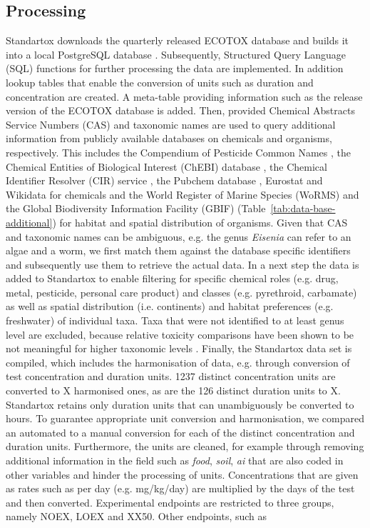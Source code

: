 \documentclass[journal,datadescriptor,accept,moreauthors,pdftex]{Definitions/mdpi}
\begin{document}
\subsection{Processing}
Standartox downloads the quarterly released ECOTOX database and builds it into a local PostgreSQL database \citep{szocs_build_2019}. Subsequently, Structured Query Language (SQL) functions for further processing the data are implemented. In addition lookup tables that enable the conversion of units such as duration and concentration are created. A meta-table providing information such as the release version of the ECOTOX database is added. Then, provided Chemical Abstracts Service Numbers (CAS) and taxonomic names are used to query additional information from publicly available databases on chemicals and organisms, respectively. This includes the Compendium of Pesticide Common Names \citep{wood_compendium_2019}, the Chemical Entities of Biological Interest (ChEBI) database \citep{hastings_chebi_2016}, the Chemical Identifier Resolver (CIR) service \citep{nationalinstitutesofhealthnih_chemical_2019}, the Pubchem database \citep{kim_pubchem_2016}, Eurostat \citep{europeancommission_eurostat_2019} and Wikidata \citep{vrandecic_wikidata_2014} for chemicals and the World Register of Marine Species (WoRMS) \citep{wormseditorialboard_world_2018} and the Global Biodiversity Information Facility (GBIF) \citep{gbif_gbif_2019} (Table~\ref{tab:data-base-additional}) for habitat and spatial distribution of organisms. Given that CAS and taxonomic names can be ambiguous, e.g. the genus \textit{Eisenia} can refer to an algae and a worm, we first match them against the database specific identifiers and subsequently use them to retrieve the actual data. In a next step the data is added to Standartox to enable filtering for specific chemical roles (e.g. drug, metal, pesticide, personal care product) and classes (e.g. pyrethroid, carbamate) as well as spatial distribution (i.e. continents) and habitat preferences (e.g. freshwater) of individual taxa. Taxa that were not identified to at least genus level are excluded, because relative toxicity comparisons have been shown to be not meaningful for higher taxonomic levels \citep{rainbow_trace_2002, buchwalter_differences_2005, malaj_physiological_2012}. Finally, the Standartox data set is compiled, which includes the harmonisation of data, e.g. through conversion of test concentration and duration units. 1237 distinct concentration units are converted to X harmonised ones, as are the 126 distinct duration units to X. Standartox retains only duration units that can unambiguously be converted to hours. To guarantee appropriate unit conversion and harmonisation, we compared an automated to a manual conversion for each of the distinct concentration and duration units. Furthermore, the units are cleaned, for example through removing additional information in the field such as \textit{food}, \textit{soil}, \textit{ai} that are also coded in other variables and hinder the processing of units. Concentrations that are given as rates such as per day (e.g. mg/kg/day) are multiplied by the days of the test and then converted. Experimental endpoints are restricted to three groups, namely NOEX, LOEX and XX50. Other endpoints, such as 
\end{document}
